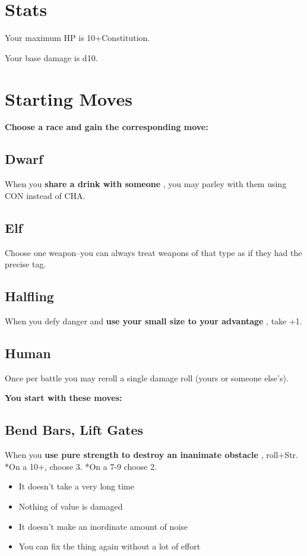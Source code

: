 \section*{Stats}

Your maximum HP is 10+Constitution.

Your base damage is d10.
\section*{Starting Moves}

{\bfseries Choose a race and gain the corresponding move:}
\subsection{Dwarf}

When you \textbf{share a drink with someone}
, you may parley with them using CON instead of CHA.
\subsection{Elf}

Choose one weapon--you can always treat weapons of that type as if they had the precise tag.
\subsection{Halfling}

When you defy danger and \textbf{use your small size to your advantage}
, take +1.
\subsection{Human}

Once per battle you may reroll a single damage roll (yours or someone else's).

\vspace{\baselineskip}
{\bfseries You start with these moves:}
\subsection{Bend Bars, Lift Gates}

When you \textbf{use pure strength to destroy an inanimate obstacle}
, roll+Str. *On a 10+, choose 3. *On a 7-9 choose 2.
\begin{itemize}
\item It doesn't take a very long time
\item Nothing of value is damaged
\item It doesn't make an inordinate amount of noise
\item You can fix the thing again without a lot of effort

\end{itemize}
